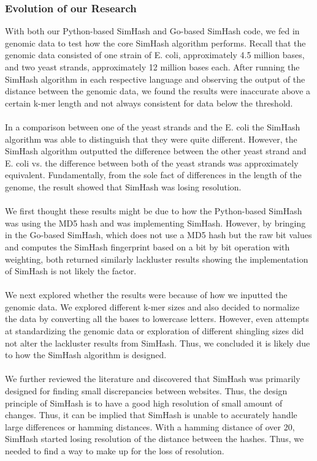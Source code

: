 \documentclass[12pt, letterpaper]{article}
\begin{document}
\subsubsection{Evolution of our Research}
With both our Python-based SimHash and Go-based SimHash code, we fed in genomic data to test how the core SimHash algorithm performs. Recall that the genomic data consisted of one strain of E. coli, approximately 4.5 million bases, and two yeast strands, approximately 12 million bases each. After running the SimHash algorithm in each respective language and observing the output of the distance between the genomic data, we found the results were inaccurate above a certain k-mer length and not always consistent for data below the threshold. \\ \\
In a comparison between one of the yeast strands and the E. coli the SimHash algorithm was able to distinguish that they were quite different. However, the SimHash algorithm outputted the difference between the other yeast strand and E. coli vs. the difference between both of the yeast strands was approximately equivalent. Fundamentally, from the sole fact of differences in the length of the genome, the result showed that SimHash was losing resolution. \\ \\
We first thought these results might be due to how the Python-based SimHash was using the MD5 hash and was implementing SimHash. However, by bringing in the Go-based SimHash, which does not use a MD5 hash but the raw bit values and computes the SimHash fingerprint based on a bit by bit operation with weighting, both returned similarly lackluster results showing the implementation of SimHash is not likely the factor.  \\ \\
We next explored whether the results were because of how we inputted the genomic data. We explored different k-mer sizes and also decided to normalize the data by converting all the bases to lowercase letters. However, even attempts at standardizing the genomic data or exploration of different shingling sizes did not alter the lackluster results from SimHash. Thus, we concluded it is likely due to how the SimHash algorithm is designed. \\ \\
We further reviewed the literature and discovered that SimHash was primarily designed for finding small discrepancies between websites. Thus, the design principle of SimHash is to have a good high resolution of small amount of changes. Thus, it can be implied that SimHash is unable to accurately handle large differences or hamming distances. With a hamming distance of over 20, SimHash started losing resolution of the distance between the hashes. Thus, we needed to find a way to make up for the loss of resolution.
\end{document}
